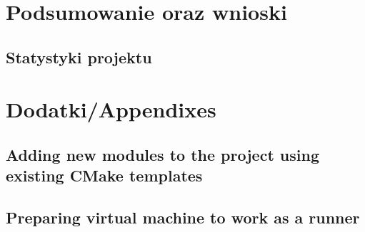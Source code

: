 \chapter{Podsumowanie oraz wnioski}
\label{cha:summary}

\section{Statystyki projektu}
\label{sec:stat}

\appendix
\chapter{Dodatki/Appendixes}
\label{cha:app}

\section{Adding new modules to the project using existing CMake templates}
\section{Preparing virtual machine to work as a runner}